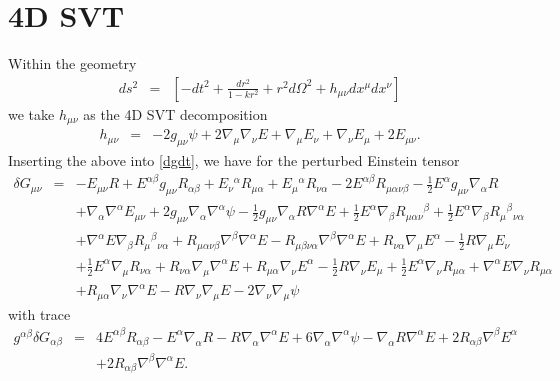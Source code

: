 \documentclass[10pt,letterpaper]{article}
\numberwithin{equation}{section}
\begin{document}
\section{4D SVT}
Within the geometry
\begin{eqnarray}
ds^2 &=& \left[ -dt^2 + \frac{dr^2}{1-kr^2} + r^2d\Omega^2 + h_{\mu\nu}dx^\mu dx^\nu\right]
\end{eqnarray}
we take $h_{\mu\nu}$ as the 4D SVT decomposition
\begin{eqnarray}
h_{\mu\nu} &=& -2 g_{\mu\nu}\psi + 2\nabla_\mu\nabla_\nu E +\nabla_\mu E_\nu + \nabla_\nu E_\mu + 2E_{\mu\nu}.
\end{eqnarray}
Inserting the above into \eqref{dgdt}, we have for the perturbed Einstein tensor
\begin{eqnarray}
\delta G_{\mu\nu} &=&- E_{\mu \nu} R
+ E^{\alpha \beta} g_{\mu \nu} R_{\alpha \beta}
+ E_{\nu}{}^{\alpha} R_{\mu \alpha}
+ E_{\mu}{}^{\alpha} R_{\nu \alpha}
- 2 E^{\alpha \beta} R_{\mu \alpha \nu \beta}
-  \tfrac{1}{2} E^{\alpha} g_{\mu \nu} \nabla_{\alpha}R\nonumber\\
&& + \nabla_{\alpha}\nabla^{\alpha}E_{\mu \nu}
+ 2 g_{\mu \nu} \nabla_{\alpha}\nabla^{\alpha}\psi
-  \tfrac{1}{2} g_{\mu \nu} \nabla_{\alpha}R \nabla^{\alpha}E
+ \tfrac{1}{2} E^{\alpha} \nabla_{\beta}R_{\mu \alpha \nu}{}^{\beta}
+ \tfrac{1}{2} E^{\alpha} \nabla_{\beta}R_{\mu}{}^{\beta}{}_{\nu \alpha}\nonumber\\
&& + \nabla^{\alpha}E \nabla_{\beta}R_{\mu}{}^{\beta}{}_{\nu \alpha}
+ R_{\mu \alpha \nu \beta} \nabla^{\beta}\nabla^{\alpha}E
-  R_{\mu \beta \nu \alpha} \nabla^{\beta}\nabla^{\alpha}E
+ R_{\nu \alpha} \nabla_{\mu}E^{\alpha}
-  \tfrac{1}{2} R \nabla_{\mu}E_{\nu}\nonumber\\
&& + \tfrac{1}{2} E^{\alpha} \nabla_{\mu}R_{\nu \alpha}
+ R_{\nu \alpha} \nabla_{\mu}\nabla^{\alpha}E
+ R_{\mu \alpha} \nabla_{\nu}E^{\alpha}
-  \tfrac{1}{2} R \nabla_{\nu}E_{\mu}
+ \tfrac{1}{2} E^{\alpha} \nabla_{\nu}R_{\mu \alpha}
+ \nabla^{\alpha}E \nabla_{\nu}R_{\mu \alpha}\nonumber\\
&& + R_{\mu \alpha} \nabla_{\nu}\nabla^{\alpha}E
-  R \nabla_{\nu}\nabla_{\mu}E
- 2 \nabla_{\nu}\nabla_{\mu}\psi
\end{eqnarray}
with trace
\begin{eqnarray}
g^{\alpha\beta}\delta G_{\alpha\beta}&=& 4 E^{\alpha \beta} R_{\alpha \beta}
-  E^{\alpha} \nabla_{\alpha}R
-  R \nabla_{\alpha}\nabla^{\alpha}E
+ 6 \nabla_{\alpha}\nabla^{\alpha}\psi
-  \nabla_{\alpha}R \nabla^{\alpha}E
+ 2 R_{\alpha \beta} \nabla^{\beta}E^{\alpha}\nonumber\\
&& + 2 R_{\alpha \beta} \nabla^{\beta}\nabla^{\alpha}E.
\end{eqnarray}
\end{document}
